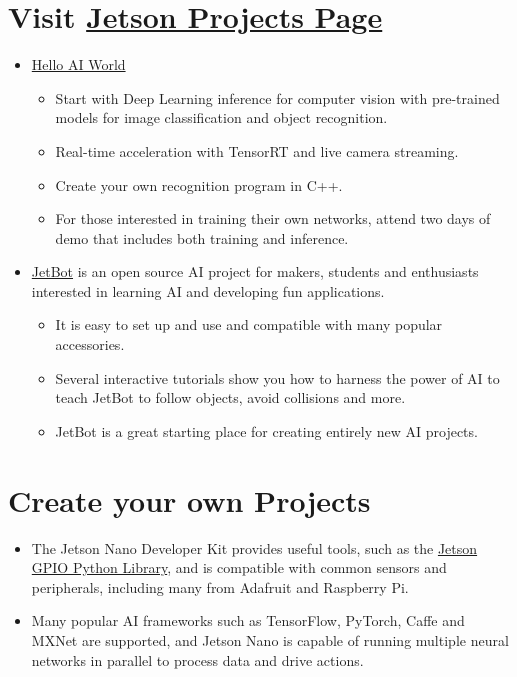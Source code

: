 \section{Visit \href{https://developer.nvidia.com/embedded/community/jetson-projects}{Jetson Projects Page}}

\begin{itemize}
    \item \href{https://developer.nvidia.com/embedded/twodaystoademo#hello_ai_world}{Hello AI World}
    \begin{itemize}
        \item Start with Deep Learning inference for computer vision with pre-trained models for image classification and object recognition.
\item Real-time acceleration with TensorRT and live camera streaming.
\item Create your own recognition program in C++.
\item For those interested in training their own networks, attend two days of demo that includes both training and inference.
    \end{itemize}
    
    \item \href{https://github.com/NVIDIA-AI-IOT/jetbot}{JetBot} is an open source AI project for makers, students and enthusiasts interested in learning AI and developing fun applications. 
    \begin{itemize}
    \item It is easy to set up and use and compatible with many popular accessories.
    \item Several interactive tutorials show you how to harness the power of AI to teach JetBot to follow objects, avoid collisions and more.
    \item JetBot is a great starting place for creating entirely new AI projects.
  \end{itemize}
\end{itemize}


\section{Create your own Projects}

\begin{itemize}
  \item The Jetson Nano Developer Kit provides useful tools, such as the \href{https://github.com/NVIDIA/jetson-gpio}{Jetson GPIO Python Library}, and is compatible with common sensors and peripherals, including many from Adafruit and Raspberry Pi.
  \item Many popular AI frameworks such as TensorFlow, PyTorch, Caffe and MXNet are supported, and Jetson Nano is capable of running multiple neural networks in parallel to process data and drive actions.
\end{itemize}


